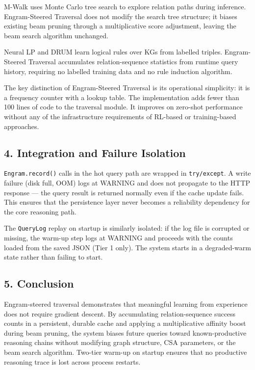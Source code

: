M-Walk uses Monte Carlo tree search to explore relation paths during inference. Engram-Steered Traversal does not modify the search tree structure; it biases existing beam pruning through a multiplicative score adjustment, leaving the beam search algorithm unchanged.

Neural LP and DRUM learn logical rules over KGs from labelled triples. Engram-Steered Traversal accumulates relation-sequence statistics from runtime query history, requiring no labelled training data and no rule induction algorithm.

The key distinction of Engram-Steered Traversal is its operational simplicity: it is a frequency counter with a lookup table. The implementation adds fewer than 100 lines of code to the traversal module. It improves on zero-shot performance without any of the infrastructure requirements of RL-based or training-based approaches.

\subsection*{4. Integration and Failure Isolation}
\texttt{Engram.record()} calls in the hot query path are wrapped in \texttt{try/except}. A write failure (disk full, OOM) logs at WARNING and does not propagate to the HTTP response --- the query result is returned normally even if the cache update fails. This ensures that the persistence layer never becomes a reliability dependency for the core reasoning path.

The \texttt{QueryLog} replay on startup is similarly isolated: if the log file is corrupted or missing, the warm-up step logs at WARNING and proceeds with the counts loaded from the saved JSON (Tier 1 only). The system starts in a degraded-warm state rather than failing to start.

\subsection*{5. Conclusion}
Engram-steered traversal demonstrates that meaningful learning from experience does not require gradient descent. By accumulating relation-sequence success counts in a persistent, durable cache and applying a multiplicative affinity boost during beam pruning, the system biases future queries toward known-productive reasoning chains without modifying graph structure, CSA parameters, or the beam search algorithm. Two-tier warm-up on startup ensures that no productive reasoning trace is lost across process restarts.

